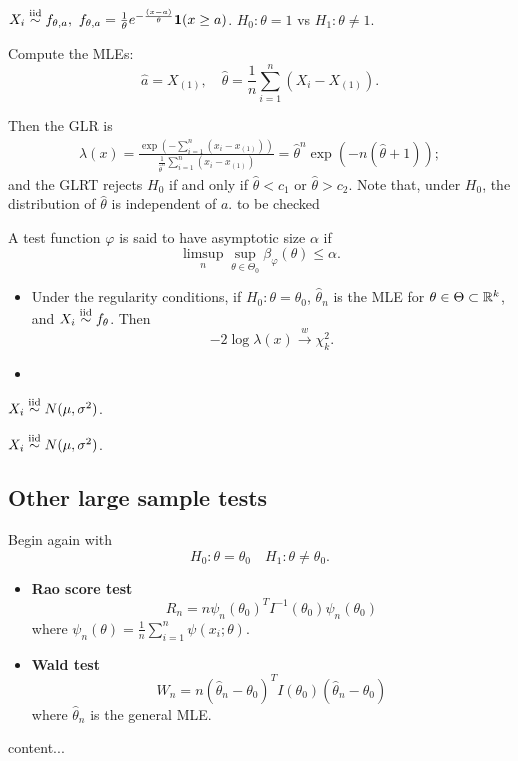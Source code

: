 \begin{exap}
	$X_i \stackrel{\text{iid}}{\sim} f_{\theta,a},\ f_{\theta,a} = \frac{1}{\theta} e^{-\frac{(x-a)}{\theta}} \boldsymbol{1}(x \geq a)$. $H_0: \theta = 1$ vs $H_1: \theta\neq 1$.
	
	Compute the MLEs:
	$$\hat{a} = X_{(1)},\quad \hat{\theta} = \frac{1}{n} \sum_{i=1}^n (X_i - X_{(1)}).$$
	
	Then the  GLR is
	\begin{align*}
		\lambda(x) = \frac{ \exp( -\sum_{i=1}^n (x_i - x_{(1)} )) }{ \frac{1}{\hat{\theta}^n} \sum_{i=1}^n (x_i - x_{(1)} ) } = \hat{\theta}^n \exp( -n(\hat{\theta} + 1 ) );
	\end{align*}
	and the GLRT rejects $H_0$ if and only if $\hat{\theta} < c_1$ or $\hat{\theta} > c_2$. Note that, under $H_0$, the distribution of $\hat{\theta}$ is independent of $a$.
	{\color{red}to be checked}
\end{exap}

\begin{mydef}
	A test function $\varphi$ is said to have asymptotic size $\alpha$ if 
	$$\limsup_n \sup_{\theta \in \Theta_0} \beta_\varphi (\theta) \leq \alpha.$$
\end{mydef}


\begin{thm}[Wilk] \textbf{ }
	\begin{itemize}
		\item Under the regularity conditions, if $H_0:\theta=\theta_0$, $\hat{\theta}_n$ is the MLE for $\theta \in \Theta \subset \mathbb{R}^k$, and $X_i \stackrel{\text{iid}}{\sim} f_\theta$. Then 
		$$ -2 \log \lambda(x) \xrightarrow{w} \chi^2_k.$$
		\item 
	\end{itemize}
\end{thm}


\begin{exap}
	$X_i \stackrel{\text{iid}}{\sim} N(\mu, \sigma^2)$.
\end{exap}

\begin{exap}
	$X_i \stackrel{\text{iid}}{\sim} N(\mu, \sigma^2)$.
\end{exap}


\subsection{Other large sample tests}
\begin{mydef} Begin again with
	$$H_0: \theta = \theta_0 \quad H_1: \theta \neq \theta_0.$$
	\begin{itemize}
		\item \textbf{Rao score test}
			$$R_n = n \psi _n (\theta_0)^T I^{-1}(\theta_0) \psi_n (\theta_0)$$
			where $\psi_n(\theta) = \frac{1}{n} \sum_{i=1}^n \psi(x_i; \theta)$.
		\item \textbf{Wald test}
			$$W_n = n(\hat{\theta}_n - \theta_0)^T I(\theta_0) (\hat{\theta}_n - \theta_0) $$
			where $\hat{\theta}_n$ is the general MLE.
	\end{itemize}
\end{mydef}
\begin{remark}
	content...
\end{remark}

